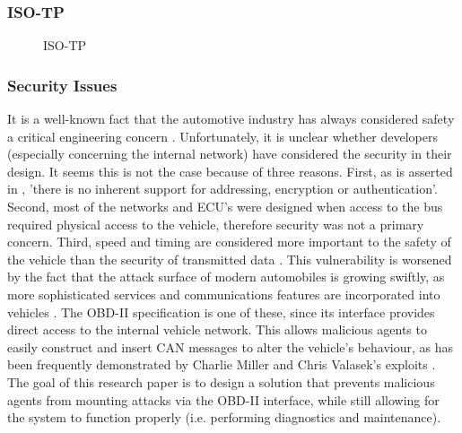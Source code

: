 \subsubsection{ISO-TP}
\begin{figure}[h]
	\centering
	\caption{ISO-TP}
	\label{fig:ISO-TP}
\end{figure} 


\subsubsection{Security Issues}
\label{subsec:obd:security_issues}

It is a well-known fact that the automotive industry has always considered safety a critical engineering concern \cite{Dyer}. Unfortunately, it is unclear whether developers (especially concerning the internal network) have considered the security in their design. It seems this is not the case because of three reasons. First, as is asserted in \cite{MillerB}, 'there is no inherent support for addressing, encryption or authentication'. Second, most of the networks and ECU's were designed when access to the bus required physical access to the vehicle, therefore security was not a primary concern. Third, speed and timing are considered more important to the safety of the vehicle than the security of transmitted data \cite{Klinedinst05}. This vulnerability is worsened by the fact that the attack surface of modern automobiles is growing swiftly, as more sophisticated services and communications features are incorporated into vehicles \cite{Kosher}. The OBD-II specification is one of these, since its interface provides direct access to the internal vehicle network. This allows malicious agents to easily construct and insert CAN messages to alter the vehicle's behaviour, as has been frequently demonstrated by Charlie Miller and Chris Valasek's exploits \cite{MillerA, MillerB, MillerC}. The goal of this research paper is to design a solution that prevents malicious agents from mounting attacks via the OBD-II interface, while still allowing for the system to function properly (i.e. performing diagnostics and maintenance). 

